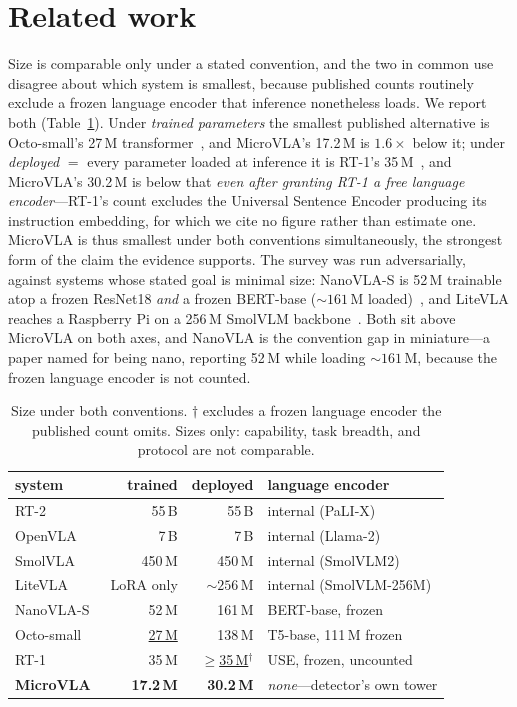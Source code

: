 \documentclass[10pt,twocolumn,letterpaper]{article}
\begin{document}
\section{Related work}

Size is comparable only under a stated convention, and the two in common use
disagree about which system is smallest, because published counts routinely
exclude a frozen language encoder that inference nonetheless loads. We report
both (Table~\ref{tab:size}). Under \emph{trained parameters} the smallest
published alternative is Octo-small's 27\,M transformer~\citep{octo2024}, and
MicroVLA's 17.2\,M is $1.6\times$ below it; under \emph{deployed} $=$ every
parameter loaded at inference it is RT-1's 35\,M~\citep{brohan2022rt1}, and
MicroVLA's 30.2\,M is below that \emph{even after granting RT-1 a free language
encoder}---RT-1's count excludes the Universal Sentence Encoder producing its
instruction embedding, for which we cite no figure rather than estimate one.
MicroVLA is thus smallest under both conventions simultaneously, the strongest
form of the claim the evidence supports. The survey was run adversarially,
against systems whose stated goal is minimal size: NanoVLA-S is 52\,M trainable
atop a frozen ResNet18 \emph{and} a frozen BERT-base
(${\sim}161$\,M loaded)~\citep{nanovla2025}, and LiteVLA reaches a Raspberry Pi
on a 256\,M SmolVLM backbone~\citep{litevla2025}. Both sit above MicroVLA on
both axes, and NanoVLA is the convention gap in miniature---a paper named for
being nano, reporting 52\,M while loading ${\sim}161$\,M, because the frozen
language encoder is not counted.

\begin{table}[h]\centering\small
\caption{Size under both conventions. $\dagger$ excludes a frozen language
encoder the published count omits. Sizes only: capability, task breadth, and
protocol are not comparable.}
\label{tab:size}
\begin{tabular}{lrrl}
\toprule
system & trained & deployed & language encoder \\
\midrule
RT-2~\citep{brohan2023rt2}        & 55\,B & 55\,B & internal (PaLI-X) \\
OpenVLA~\citep{kim2024openvla}    & 7\,B  & 7\,B  & internal (Llama-2) \\
SmolVLA~\citep{shukor2025smolvla} & 450\,M & 450\,M & internal (SmolVLM2) \\
LiteVLA~\citep{litevla2025}       & LoRA only & ${\sim}256$\,M & internal (SmolVLM-256M) \\
NanoVLA-S~\citep{nanovla2025}     & 52\,M & 161\,M & BERT-base, frozen \\
Octo-small~\citep{octo2024}       & \underline{27\,M} & 138\,M & T5-base, 111\,M frozen \\
RT-1~\citep{brohan2022rt1}        & 35\,M & \underline{$\ge$35\,M}$^\dagger$ & USE, frozen, uncounted \\
\midrule
\textbf{MicroVLA}                 & \textbf{17.2\,M} & \textbf{30.2\,M} & \emph{none}---detector's own tower \\
\bottomrule
\end{tabular}
\end{table}
\end{document}
